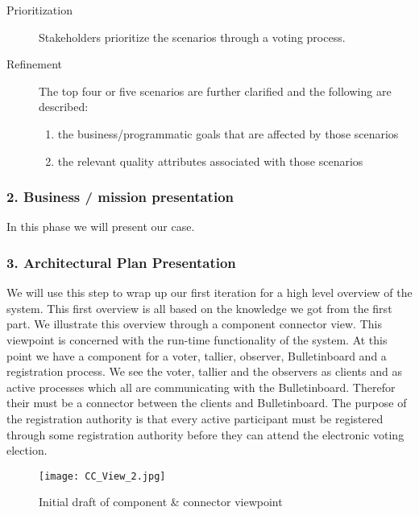 \begin{description}
    \item [Prioritization] 
  Stakeholders prioritize the scenarios through a voting process. 
    
    \item [Refinement]
        The top four or five scenarios are further clarified and the following are described:
        \begin{enumerate}
            \item the business/programmatic goals that are affected by those scenarios
            \item the relevant quality attributes associated with those scenarios   
        \end{enumerate}

   

\end{description}




\subsubsection{2. Business / mission presentation}
In this phase we will present our case.
 
\subsubsection{3. Architectural Plan Presentation}
We will use this step to wrap up our first iteration for a high level overview of the system. This first overview is all based on the knowledge we got from the first part. We illustrate this overview through a component connector view. This viewpoint is concerned with the run-time functionality of the system.  At this point we have a component for a voter, tallier, observer, Bulletinboard and a registration process. We see the voter, tallier and the observers as clients and as active processes which all are communicating with the Bulletinboard. Therefor their must be a connector between the clients and Bulletinboard. The purpose of the registration authority is that every active participant must be registered through some registration authority before they can attend the electronic voting election. 

\begin{figure}[H]
\centering
     \texttt{[image: CC\_View\_2.jpg]}
     \caption{Initial draft of component \& connector viewpoint}     
\end{figure}
 


